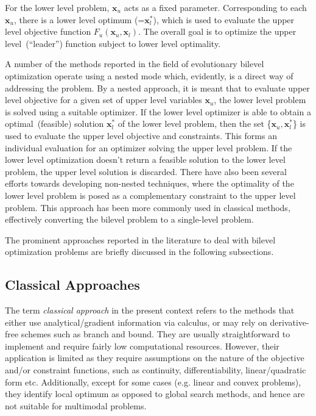 For the lower level problem, $\mathbf{x}_u$ acts as a fixed parameter. Corresponding to each $\mathbf{x}_u$, there is a lower level optimum (=$\mathbf{x}^*_l$), which is used to evaluate the upper level objective function $F_u(\mathbf{x}_u, \mathbf{ x}_l)$. The overall goal is to optimize the upper level~(``leader'') function subject to lower level optimality.  
 
A number of the methods reported in the field of evolutionary bilevel optimization operate using a nested mode which, evidently, is a direct way of addressing the problem. By a nested approach, it is meant that to evaluate upper level objective for a given set of upper level variables $\mathbf{x}_u$, the lower level problem is solved using a suitable optimizer. If the lower level optimizer is able to obtain a optimal~(feasible) solution $\mathbf{x}_l^*$ of the lower level problem, then the set \{$\mathbf{x}_u,\mathbf{x}^*_l$\} is used to evaluate the upper level objective and constraints. This forms an individual evaluation for an optimizer solving the upper level problem. If the lower level optimization doesn't return a feasible solution to the lower level problem, the upper level solution is discarded. There have also been several efforts towards developing non-nested techniques, where the optimality of the lower level problem is posed as a complementary constraint to the upper level problem. This approach has been more commonly used in classical methods, effectively converting the bilevel problem to a single-level problem. 

The prominent approaches reported in the literature to deal with bilevel optimization problems are briefly discussed in the following subsections. 



\subsection{Classical Approaches}
\label{classical_all}

The term \textit{classical approach} in the present context refers to the methods that either use analytical/gradient information via calculus, or may rely on derivative-free schemes such as branch and bound. They are usually straightforward to implement and require fairly low computational resources. However, their application is limited as they require assumptions on the nature of the objective and/or constraint functions, such as continuity, differentiability, linear/quadratic form etc. Additionally, except for some cases (e.g. linear and convex problems), they identify local optimum as opposed to global search methods, and hence are not suitable for multimodal problems. 

